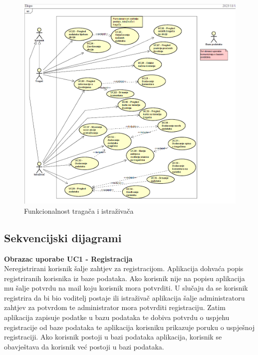 					\begin{figure}[H]
						\includegraphics[scale=0.8]{slike/dijagram ekipa.png} %
						\centering
						\caption{Funkcionalnost tragača i istraživača}
						\label{fig:Funkcionalnost tragača i istraživača}
					\end{figure}
				
					\eject		
				
			\subsection{Sekvencijski dijagrami}
				
				\noindent 
				\textbf{Obrazac uporabe UC1 - Registracija}\\

				\noindent 
				Neregistrirani korisnik šalje zahtjev za registracijom. Aplikacija dohvaća popis registriranih korisnika
        				iz baze podataka.
        				Ako korisnik nije na popisu aplikacija mu šalje potvrdu na mail koju korisnik mora potvrditi.
        				U slučaju da se korisnik registrira da bi bio voditelj postaje ili istraživač aplikacija šalje administratoru
        				zahtjev za potvrdom te administrator mora potvrditi registraciju.
        				Zatim aplikacija zapisuje podatke u bazu podataka te dobiva potvrdu o uspjehu registracije od baze podataka
        				te aplikacija korisniku prikazuje poruku o uspješnoj registraciji.
        				Ako korisnik postoji u bazi podataka aplikacija, korisnik se obavještava da korisnik već postoji u bazi podataka.

